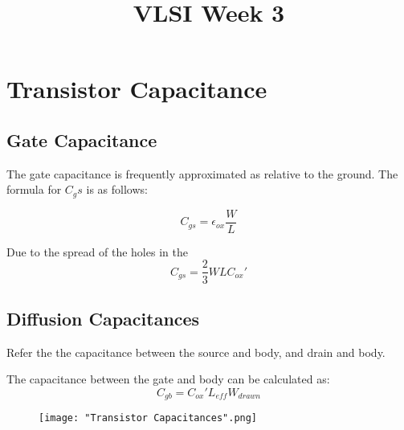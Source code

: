 \documentclass[•]{article}
\begin{document}
\title{VLSI Week 3}
\maketitle

\tableofcontents
\newpage

\section{Transistor Capacitance}
\subsection{Gate Capacitance}
The gate capacitance is frequently approximated as relative to the ground. The formula for $C_gs$ is as follows:

\begin{equation}
C_{gs} = \epsilon_{ox} \frac{W}{L}
\end{equation}

Due to the spread of the holes in the 
\begin{equation}
C_{gs} = \frac{2}{3}WLC_{ox}'
\end{equation}

\subsection{Diffusion Capacitances}
Refer the the capacitance between the source and body, and drain and body. 

The capacitance between the gate and body can be calculated as:
\begin{equation}
C_{gb} = C_{ox}'L_{eff}W_{drawn}
\end{equation}

\begin{figure}[H]
\texttt{[image: "Transistor Capacitances".png]}
\end{figure}
\end{document}
